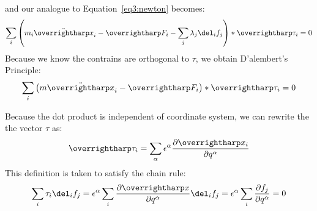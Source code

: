 and our analogue to Equation~\ref{eq3:newton} becomes:
\begin{equation}
	\sum_i \left(m_i\ddot{\vv{x}}_i-\vv{F}_i-\sum_j \lambda_j\del_i f_j\right)*\vv{\tau}_i=0
\end{equation}
Because we know the contrains are orthogonal to \(\tau\), we obtain D'alembert's Principle:
\begin{equation}
	\sum_i\left(m\ddot{\vv x}_i-\vv{F}_i\right)*\vv{\tau}_i=0 \label{eq3:dalembert}
\end{equation}

Because the dot product is independent of coordinate system, we can rewrite the the vector \(\tau\) as:
\[\vv\tau_i = \sum_\alpha \epsilon^\alpha \pder{\vv{x}_i}{q^\alpha}\]
This definition is taken to satisfy the chain rule:
\[\sum_i\tau_i\del_if_j = \epsilon^\alpha \sum_i\pder{\vv{x}}{q^\alpha}\del_if_j = \epsilon^\alpha\sum_i\pder{f_j}{q^\alpha}=0\]

